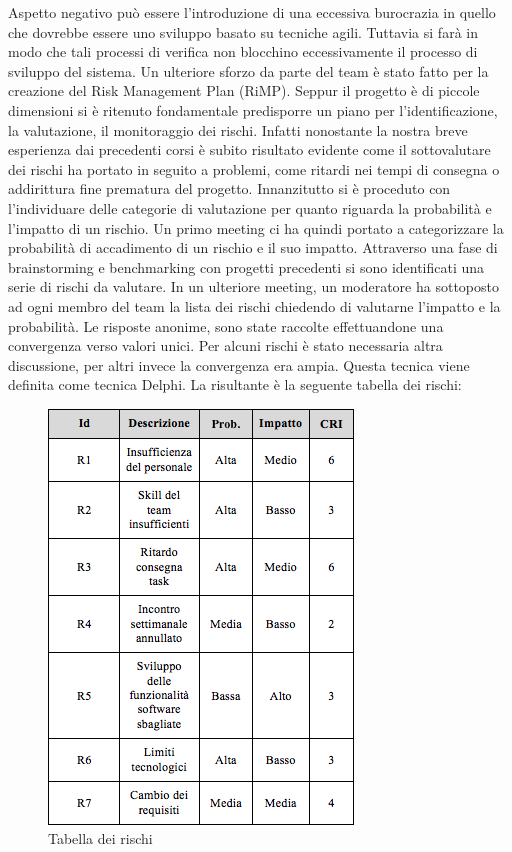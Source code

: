 Aspetto negativo pu\`{o} essere l\rq introduzione di una eccessiva burocrazia in quello che dovrebbe essere uno sviluppo basato su tecniche agili. Tuttavia si far\`{a} in modo che tali processi di verifica non blocchino eccessivamente il processo di sviluppo del sistema.
Un ulteriore sforzo da parte del team \`{e} stato fatto per la creazione del Risk Management Plan (RiMP).
Seppur il progetto \`{e} di piccole dimensioni si \`{e} ritenuto fondamentale predisporre un piano per l\rq identificazione, la valutazione, il monitoraggio dei rischi.
Infatti nonostante la nostra breve esperienza dai precedenti corsi \`{e} subito risultato evidente come il sottovalutare dei rischi ha portato in seguito a problemi, come ritardi nei tempi di consegna o addirittura fine prematura del progetto.
Innanzitutto si \`{e} proceduto con l\rq individuare delle categorie di valutazione per quanto riguarda la probabilit\`{a} e l\rq impatto di un rischio.
Un primo meeting ci ha quindi portato a categorizzare la probabilit\`{a} di accadimento di un rischio e il suo impatto.
Attraverso una fase di brainstorming e benchmarking con progetti precedenti si sono identificati una serie di rischi da valutare. 
In un ulteriore meeting, un moderatore ha sottoposto ad ogni membro del team la lista dei rischi chiedendo di valutarne l\rq impatto e la probabilit\`{a}. Le risposte anonime, sono state raccolte effettuandone una convergenza verso valori unici.
Per alcuni rischi \`{e} stato necessaria altra discussione, per altri invece la convergenza era ampia. Questa tecnica viene definita come tecnica Delphi.
La risultante \`{e} la seguente tabella dei rischi:
\begin{figure}[h]
\centering
\includegraphics[scale=.6]{img/17.png}
\caption{Tabella dei rischi}
\label{fig:cd}
\end{figure}
